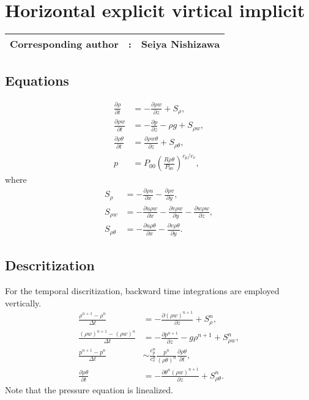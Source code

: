 \chapter{Horizontal explicit virtical implicit}
\label{chap:hevi}
{\bf \Large 
\begin{tabular}{ccc}
\hline
  Corresponding author & : & Seiya Nishizawa\\
\hline
\end{tabular}
}

\section{Equations}

\begin{align}
  \frac{\partial \rho}{\partial t}
  &= -\frac{\partial \rho w}{\partial z} + S_\rho, \\
  \frac{\partial \rho w}{\partial t}
  &= -\frac{\partial p}{\partial z} -\rho g + S_{\rho w}, \\
  \frac{\partial \rho\theta}{\partial t}
  &= \frac{\partial \rho w\theta}{\partial z} + S_{\rho\theta}, \\
  p &= P_{00}\left(\frac{R\rho\theta}{P_{00}}\right)^{c_p/c_v},
\end{align}
where
\begin{align}
  S_\rho &= - \frac{\partial \rho u}{\partial x}
           - \frac{\partial \rho v}{\partial y}, \\
  S_{\rho w} &= - \frac{\partial u\rho w}{\partial x}
              - \frac{\partial v\rho w}{\partial y}
              - \frac{\partial w\rho w}{\partial z}, \\
  S_{\rho\theta} &= - \frac{\partial u\rho\theta}{\partial x}
                 - \frac{\partial v\rho\theta}{\partial y}.
\end{align}

\section{Descritization}

For the temporal discritization, backward time integrations are employed vertically.
\begin{align}
  \frac{\rho^{n+1}-\rho^n}{\Delta t}
  &= -\frac{\partial (\rho w)^{n+1}}{\partial z} + S_\rho^n, \\
  \frac{(\rho w)^{n+1}-(\rho w)^n}{\Delta t}
  &= -\frac{\partial p^{n+1}}{\partial z} -g\rho^{n+1} + S_{\rho w}^n, \\
  \frac{p^{n+1} - p^n}{\Delta t}
  &\sim \frac{c_p^n}{c_v^n} \frac{p^n}{(\rho\theta)^n}\frac{\partial \rho\theta}{\partial t}, \\
  \frac{\partial \rho\theta}{\partial t}
  &= -\frac{\partial \theta^n (\rho w)^{n+1}}{\partial z} + S_{\rho\theta}^n.
\end{align}
Note that the pressure equation is linealized.

